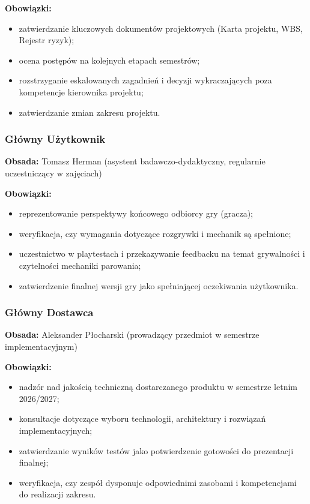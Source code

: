 \documentclass[11pt,a4paper]{article}
\begin{document}
\textbf{Obowiązki:}
\begin{itemize}[noitemsep]
    \item zatwierdzanie kluczowych dokumentów projektowych (Karta projektu, WBS, Rejestr ryzyk);
    \item ocena postępów na kolejnych etapach semestrów;
    \item rozstrzyganie eskalowanych zagadnień i decyzji wykraczających poza kompetencje kierownika projektu;
    \item zatwierdzanie zmian zakresu projektu.
\end{itemize}

\subsubsection{Główny Użytkownik}
\textbf{Obsada:} Tomasz Herman (asystent badawczo-dydaktyczny, regularnie uczestniczący w zajęciach)

\textbf{Obowiązki:}
\begin{itemize}[noitemsep]
    \item reprezentowanie perspektywy końcowego odbiorcy gry (gracza);
    \item weryfikacja, czy wymagania dotyczące rozgrywki i mechanik są spełnione;
    \item uczestnictwo w playtestach i przekazywanie feedbacku na temat grywalności i czytelności mechaniki parowania;
    \item zatwierdzenie finalnej wersji gry jako spełniającej oczekiwania użytkownika.
\end{itemize}

\subsubsection{Główny Dostawca}
\textbf{Obsada:} Aleksander Płocharski (prowadzący przedmiot w semestrze implementacyjnym)

\textbf{Obowiązki:}
\begin{itemize}[noitemsep]
    \item nadzór nad jakością techniczną dostarczanego produktu w semestrze letnim 2026/2027;
    \item konsultacje dotyczące wyboru technologii, architektury i rozwiązań implementacyjnych;
    \item zatwierdzanie wyników testów jako potwierdzenie gotowości do prezentacji finalnej;
    \item weryfikacja, czy zespół dysponuje odpowiednimi zasobami i kompetencjami do realizacji zakresu.
\end{itemize}
\end{document}
